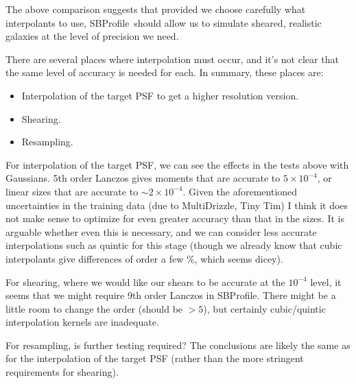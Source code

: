 \documentclass[preprint]{aastex}
\newcommand{\sbp}{SBProfile}
\begin{document}
The above comparison suggests that provided we choose carefully what interpolants to use, \sbp\
should allow us to simulate sheared, realistic galaxies at the level of precision we need.

There are several places where interpolation must occur, and it's not clear that the same level of
accuracy is needed for each.  In summary, these places are:
\begin{itemize}
\item Interpolation of the target PSF to get a higher resolution version.
\item Shearing.
\item Resampling.
\end{itemize}

For interpolation of the target PSF, we can see the effects in the tests above with Gaussians.  5th
order Lanczos gives moments that are accurate to $5\times 10^{-4}$, or linear sizes that are
accurate to $\sim 2\times 10^{-4}$.  Given the aforementioned uncertainties in the training data
(due to MultiDrizzle, Tiny Tim) I think it does not make sense to optimize for even greater accuracy
than that in the sizes.  It is arguable whether even this is necessary, and we can consider less
accurate interpolations such as quintic for this stage (though we already know that cubic
interpolants give differences of order a few \%, which seems dicey).

For shearing, where we would like our shears to be accurate at the $10^{-4}$ level, it seems that we
might require 9th order Lanczos in \sbp.  There might be a little room to change the order (should be $>5$),
but certainly cubic/quintic interpolation kernels are inadequate.

For resampling, is further testing required?  The conclusions are likely the same as for the
interpolation of the target PSF (rather than the more stringent requirements for shearing).
\end{document}
